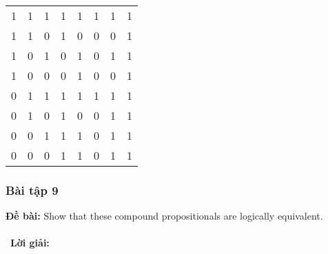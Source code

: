 \documentclass[a4paper]{article}
\begin{document}
\begin{table} [h]
\begin{tabular} {|c|c|c|c|c|c|c|c|}
			\hline
			1&1&1&1&1&1&1&1\\
			1&1&0&1&0&0&0&1\\
			1&0&1&0&1&0&1&1\\
			1&0&0&0&1&0&0&1\\
			0&1&1&1&1&1&1&1\\
			0&1&0&1&0&0&1&1\\
			0&0&1&1&1&0&1&1\\
			0&0&0&1&1&0&1&1\\
			\hline
		\end{tabular}
	\end{table}
\clearpage
\subsubsection{Bài tập 9}
\textbf{Đề bài:} Show that these compound propositionals are logically equivalent.
\\\ \\\
\textbf{Lời giải:} \\\ \\\
\end{document}
